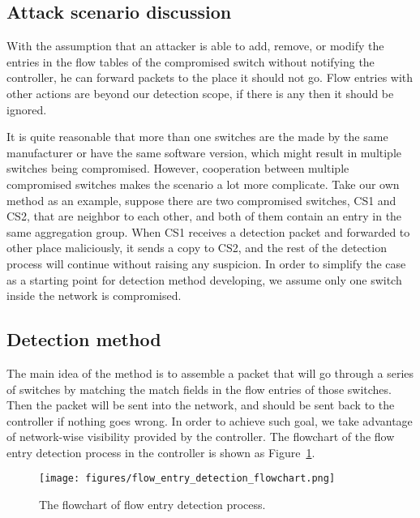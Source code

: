 \subsection{Attack scenario discussion}
\label{flow_entry_verification_attack_scenario}
With the assumption that an attacker is able to add, remove, or modify the entries in the flow tables of the compromised switch without notifying the controller, he can forward packets to the place it should not go. Flow entries with other actions are beyond our detection scope, if there is any then it should be ignored.

It is quite reasonable that more than one switches are the made by the same manufacturer or have the same software version, which might result in multiple switches being compromised. However, cooperation between multiple compromised switches makes the scenario a lot more complicate. Take our own method as an example, suppose there are two compromised switches, CS1 and CS2, that are neighbor to each other, and both of them contain an entry in the same aggregation group. When CS1 receives a detection packet and forwarded to other place maliciously, it sends a copy to CS2, and the rest of the detection process will continue without raising any suspicion. In order to simplify the case as a starting point for detection method developing, we assume only one switch inside the network is compromised.

\subsection{Detection method}
\label{Detection_method}
The main idea of the method is to assemble a packet that will go through a series of switches by matching the match fields in the flow entries of those switches. Then the packet will be sent into the network, and should be sent back to the controller if nothing goes wrong. In order to achieve such goal, we take advantage of network-wise visibility provided by the controller. The flowchart of the flow entry detection process in the controller is shown as Figure~\ref{flow_entry_detection_flowchart}. 

\begin{figure}[H]
\begin{center} 
\texttt{[image: figures/flow\_entry\_detection\_flowchart.png]}
\end{center}
\caption{The flowchart of flow entry detection process.}
\label{flow_entry_detection_flowchart}
\end{figure}

